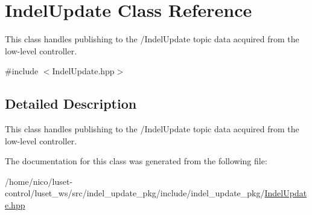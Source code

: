 \hypertarget{classIndelUpdate}{}\section{Indel\+Update Class Reference}
\label{classIndelUpdate}


This class handles publishing to the /\+Indel\+Update topic data acquired from the low-\/level controller.  




{\ttfamily \#include $<$Indel\+Update.\+hpp$>$}



\subsection{Detailed Description}
This class handles publishing to the /\+Indel\+Update topic data acquired from the low-\/level controller. 

The documentation for this class was generated from the following file\+:\begin{DoxyCompactItemize}
\item 
/home/nico/luset-\/control/luset\+\_\+ws/src/indel\+\_\+update\+\_\+pkg/include/indel\+\_\+update\+\_\+pkg/\hyperlink{IndelUpdate_8hpp}{Indel\+Update.\+hpp}\end{DoxyCompactItemize}
